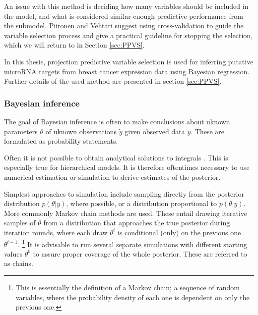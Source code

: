 An issue with this method is deciding how many variables should be included
in the model, and what is considered similar-enough predictive performance
from the submodel. Piironen and Vehtari suggest using cross-validation
to guide the variable selection process and give a practical guideline
for stopping the selection, which we will return to in Section \ref{sec:PPVS}.

In this thesis, projection predictive variable selection is used for
inferring putative microRNA targets from breast cancer expression
data using Bayesian regression. Further details of the used method are
presented in section \ref{sec:PPVS}.



\subsubsection{Bayesian inference}\label{simulation}

The goal of Bayesian inference is often to make conclusions about uknown
parameters $\theta$ of uknown observations $\tilde{y}$ given observed data
$y$. These are formulated as probability statements.

Often it is not possible to obtain analytical solutions to integrals
. This is especially true for hierarchical models. It is therefore
oftentimes necessary to use numerical estimation or simulation to
derive estimates of the posterior.



Simplest approaches to simulation include sampling directly from the posterior
distribution $p(\theta|y)$, where possible, or a distribution proportional
to $p(\theta|y)$. More commonly Markov chain methods are used. These entail
drawing iterative samples of $\theta$ from a distribution that approaches
the true posterior during iteration rounds, where each draw $\theta^t$ is
conditional (only) on the previous one $\theta^{t-1}$.
\footnote{This is essentially the definition of a Markov chain; a sequence of random
variables, where the probability density of each one is dependent on only the
previous one.} It is advisable to run several separate simulations with
different starting values $\theta^0$ to assure proper coverage of the whole
posterior. These are referred to as chains.

